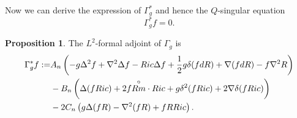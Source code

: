 \documentclass[12pt]{amsart}
\theoremstyle{definition}
\newtheorem{proposition}[theorem]{Proposition}
\theoremstyle{remark}
\numberwithin{equation}{section}
\begin{document}
Now we can derive the expression of $\Gamma_g^*$ and hence the $Q$-singular equation $$\Gamma_g^* f = 0.$$
\begin{proposition}\label{prop:Gamma^*}
The $L^2$-formal adjoint of $\Gamma_g$ is
\begin{align*}
\Gamma_g^* f :=& A_n \left(  - g \Delta^2 f + \nabla^2
\Delta f - Ric \Delta f + \frac{1}{2} g \delta (f dR) + \nabla ( f
dR) - f \nabla^2 R  \right)\\ \notag
& - B_n \left( \Delta (f Ric) + 2 f
\overset{\circ}{Rm}\cdot Ric + g \delta^2 (f Ric) + 2 \nabla \delta (f
Ric) \right)\\ \notag
&- 2 C_n \left( g\Delta (f R) - \nabla^2 (f R) + f R
Ric \right).
\end{align*}
\end{proposition}
\end{document}
